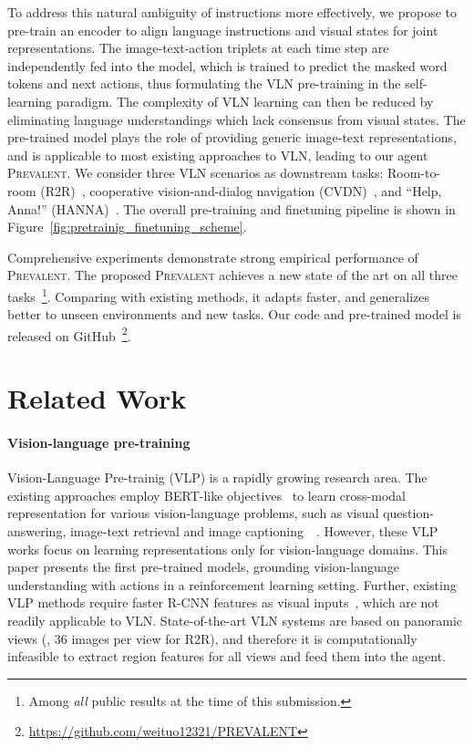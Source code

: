 \documentclass[10pt,twocolumn,letterpaper]{article}
\newcommand{\short}{\textsc{Prevalent}}
\begin{document}
To address this natural ambiguity of instructions more effectively, we propose to pre-train an encoder to align language instructions and visual states for joint representations. The image-text-action triplets at each time step are independently fed into the model, which is trained to predict the masked word tokens and next actions, thus formulating the VLN pre-training in the self-learning paradigm. The complexity of VLN learning can then be reduced by eliminating language understandings which lack consensus from visual states. The pre-trained model plays the role of providing generic image-text representations, and is applicable to most existing approaches to VLN, leading to our agent \short{}. We consider three VLN scenarios as downstream tasks: Room-to-room (R2R)~\cite{anderson2018vision}, cooperative vision-and-dialog navigation (CVDN)~\cite{thomason2019vision}, and ``Help, Anna!'' (HANNA)~\cite{nguyen2019help}. The overall pre-training and finetuning pipeline is shown in Figure~\ref{fig:pretrainig_finetuning_scheme}.


Comprehensive experiments demonstrate strong empirical performance of \short{}. The proposed \short{} achieves a new state of the art on all three tasks~\footnote{Among \emph{all} public results at the time of this submission.}.
Comparing with existing methods, it adapts faster, and generalizes better to unseen environments and new tasks.
Our code and pre-trained model is released on GitHub~\footnote{\url{https://github.com/weituo12321/PREVALENT}}.

\section{Related Work}

\paragraph{Vision-language pre-training}
Vision-Language Pre-trainig (VLP) is a rapidly growing research area. The existing approaches employ BERT-like objectives~\cite{devlin2018bert} to learn cross-modal representation for various vision-language problems, such as visual question-answering, image-text retrieval and image captioning~\etc~\cite{sun2019videobert,tan2019lxmert,lu2019vilbert,zhou2019unified,su2019vl,li2019unicoder}.
However, these VLP works focus on learning representations only for vision-language domains. This paper presents the first pre-trained models, grounding vision-language understanding with actions in a reinforcement learning setting. Further, existing VLP methods require faster R-CNN features as visual inputs~\cite{girshick2015fast,anderson2018bottom}, which are not readily applicable to VLN. State-of-the-art VLN systems are based on panoramic views (\eg, 36 images per view for R2R), and therefore it is computationally infeasible to extract region features for all views and feed them into the agent.    
\end{document}
